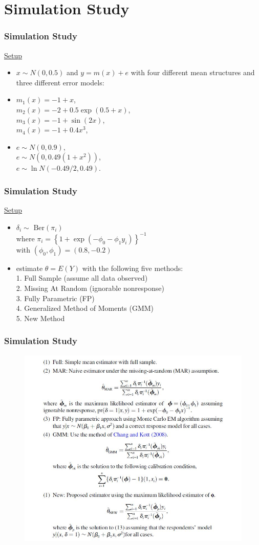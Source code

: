 \documentclass{beamer}
\newcommand{\bra}[1]{\left(#1\right)}
\newcommand{\cbra}[1]{\left\{#1\right\}}
\newcommand{\e}[1]{$\displaystyle{#1}$}
\begin{document}
\section{Simulation Study}
\begin{frame}
\frametitle{Simulation Study}
\underline{Setup}
\begin{itemize}
\item \e{x \sim N(0, 0.5)} and \e{y=m(x)+e} with four different mean structures and three different error models:\medskip
\item \e{m_1(x)=-1+x},\\ \e{m_2(x)=-2+0.5\exp(0.5+x)},\\ \e{m_3(x)=-1+\sin(2x)},\\ \e{m_4(x)=-1+0.4x^3},\medskip
\item \e{e \sim N(0, 0.9)},\\ \e{e \sim N\bra{0, 0.49\bra{1+x^2}}},\\ \e{e \sim \ln N(-0.49/2, 0.49)}.\medskip
\end{itemize}
\end{frame}

\begin{frame}
\frametitle{Simulation Study}
\underline{Setup}
\begin{itemize}
\item \e{\delta_i \sim \text{ Ber}\bra{\pi_i}}\\where \e{\pi_i = \cbra{1+\exp\bra{-\phi_0-\phi_1y_i}}^{-1}}\\
		with \e{\bra{\phi_0, \phi_1}=(0.8, -0.2)}\medskip
\item estimate \e{\theta=E\bra{Y}} with the following five methods:\\
	 1. Full Sample (assume all data observed)\\
	 2. Missing At Random (ignorable nonresponse)\\
	 3. Fully Parametric (FP)\\
	 4. Generalized Method of Moments (GMM)\\
	 5. New Method
\end{itemize}
\end{frame}

\begin{frame}
\frametitle{Simulation Study}
\begin{figure}
\includegraphics[width=0.7\linewidth]{solver.jpg}
\end{figure}
\end{frame}
\end{document}
